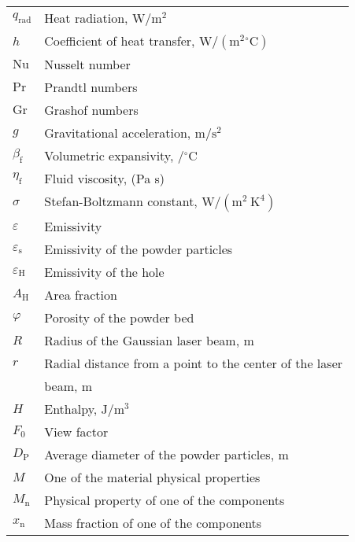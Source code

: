 \documentclass[10pt]{article}
\begin{document}
\begin{center}
\begin{tabular}{ll}
$q_{\mathrm{rad}}$ & Heat radiation, $\mathrm{W} / \mathrm{m}^{2}$ \\
$h$ & Coefficient of heat transfer, $\mathrm{W} /\left(\mathrm{m}^{2}{ }^{\circ} \mathrm{C}\right)$ \\
$\mathrm{Nu}$ & Nusselt number \\
$\mathrm{Pr}$ & Prandtl numbers \\
$\mathrm{Gr}$ & Grashof numbers \\
$g$ & Gravitational acceleration, $\mathrm{m} / \mathrm{s}^{2}$ \\
$\beta_{\mathrm{f}}$ & Volumetric expansivity, $/{ }^{\circ} \mathrm{C}$ \\
$\eta_{\mathrm{f}}$ & Fluid viscosity, (Pa s) \\
$\sigma$ & Stefan-Boltzmann constant, $\mathrm{W} /\left(\mathrm{m}^{2} \mathrm{~K}^{4}\right)$ \\
$\varepsilon$ & Emissivity \\
$\varepsilon_{\mathrm{s}}$ & Emissivity of the powder particles \\
$\varepsilon_{\mathrm{H}}$ & Emissivity of the hole \\
$A_{\mathrm{H}}$ & Area fraction \\
$\varphi$ & Porosity of the powder bed \\
$R$ & Radius of the Gaussian laser beam, $\mathrm{m}$ \\
$r$ & Radial distance from a point to the center of the laser \\
 & beam, $\mathrm{m}$ \\
$H$ & Enthalpy, $\mathrm{J} / \mathrm{m}^{3}$ \\
$F_{0}$ & View factor \\
$D_{\mathrm{P}}$ & Average diameter of the powder particles, $\mathrm{m}$ \\
$M$ & One of the material physical properties \\
$M_{\mathrm{n}}$ & Physical property of one of the components \\
$x_{\mathrm{n}}$ & Mass fraction of one of the components \\
\end{tabular}
\end{center}
\end{document}
